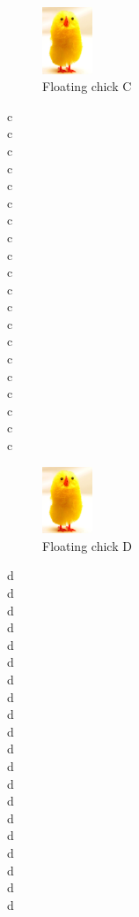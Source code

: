 \documentclass[12pt]{article}
\begin{document}
\begin{figure}
\includegraphics[height=2cm]{image.png}
\caption{Floating chick C}
\end{figure}

c \\ c \\ c \\ c\\ c \\ c \\ c \\ c \\ c\\ c \\
c \\ c \\ c \\ c\\ c \\ c \\ c \\ c \\ c\\ c \\

\begin{figure}
\includegraphics[height=2cm]{image.png}
\caption{Floating chick D}
\end{figure}

d \\ d \\ d \\ d\\ d \\ d \\ d \\ d \\ d\\ d \\
d \\ d \\ d \\ d\\ d \\ d \\ d \\ d \\ d\\ d \\
\end{document}
